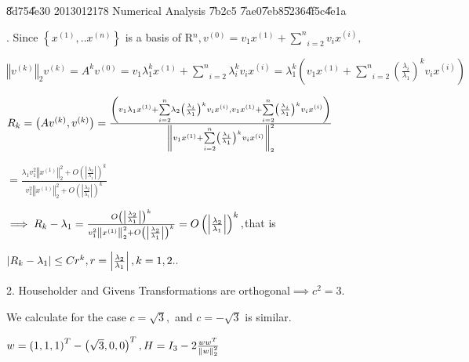 \documentclass{article}
\begin{document}
\bigskip \bigskip \U{8d75}\U{4e30} 2013012178 Numerical Analysis \U{7b2c}5 
\U{7ae0}\U{7eb8}\U{5236}\U{4f5c}\U{4e1a}

. Since $\left\{ x^{\left( 1\right) },..x^{\left( n\right)
}\right\} $ is a basis of R$^{n},v^{\left( 0\right) }=v_{1}x^{\left(
1\right) }+\underset{i=2}{\overset{n}{\sum }}v_{i}x^{\left( i\right) },$

$\left\Vert v^{\left( k\right) }\right\Vert _{2}v^{\left( k\right)
}=A^{k}v^{\left( 0\right) }=v_{1}\lambda _{1}^{k}x^{\left( 1\right) }+%
\underset{i=2}{\overset{n}{\sum }}\lambda _{i}^{k}v_{i}x^{\left( i\right)
}=\lambda _{1}^{k}\left( v_{1}x^{\left( 1\right) }+\underset{i=2}{\overset{n}%
{\sum }}\left( \frac{\lambda _{i}}{\lambda _{1}}\right) ^{k}v_{i}x^{\left(
i\right) }\right) $

$R_{k}=\left( Av^{\left( k\right) },v^{\left( k\right) }\right) =\frac{%
\left( v_{1}\lambda _{1}x^{\left( 1\right) }+\underset{i=2}{\overset{n}{\sum 
}}\lambda _{2}\left( \frac{\lambda _{i}}{\lambda _{1}}\right)
^{k}v_{i}x^{\left( i\right) },v_{1}x^{\left( 1\right) }+\underset{i=2}{%
\overset{n}{\sum }}\left( \frac{\lambda _{i}}{\lambda _{1}}\right)
^{k}v_{i}x^{\left( i\right) }\right) }{\left\Vert v_{1}x^{\left( 1\right) }+%
\underset{i=2}{\overset{n}{\sum }}\left( \frac{\lambda _{i}}{\lambda _{1}}%
\right) ^{k}v_{i}x^{\left( i\right) }\right\Vert _{2}^{2}}$

$=\frac{\lambda _{1}v_{1}^{2}\left\Vert x^{\left( 1\right) }\right\Vert
_{2}^{2}+O\left( \left\vert \frac{\lambda _{2}}{\lambda _{1}}\right\vert
\right) ^{k}}{v_{1}^{2}\left\Vert x^{\left( 1\right) }\right\Vert
_{2}^{2}+O\left( \left\vert \frac{\lambda _{2}}{\lambda _{1}}\right\vert
\right) ^{k}}$

$\implies R_{k}-\lambda _{1}=\frac{O\left( \left\vert \frac{\lambda _{2}}{%
\lambda _{1}}\right\vert \right) ^{k}}{v_{1}^{2}\left\Vert x^{\left(
1\right) }\right\Vert _{2}^{2}+O\left( \left\vert \frac{\lambda _{2}}{%
\lambda _{1}}\right\vert \right) ^{k}}=O\left( \left\vert \frac{\lambda _{2}%
}{\lambda _{1}}\right\vert \right) ^{k},$that is 

$\left\vert R_{k}-\lambda _{1}\right\vert \leq Cr^{k},r=\left\vert \frac{%
\lambda _{2}}{\lambda _{1}}\right\vert ,k=1,2..$

2. Householder and Givens Transformations are orthogonal$\implies c^{2}=3.$

We calculate for the case $c=\sqrt{3},$ and $c=-\sqrt{3}$ is similar.

$w=\left( 1,1,1\right) ^{T}-\left( \sqrt{3},0,0\right) ^{T},H=I_{3}-2\frac{%
ww^{T}}{\left\Vert w\right\Vert _{2}^{2}}$
\end{document}
